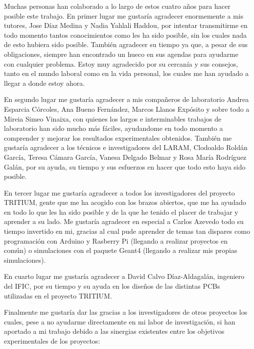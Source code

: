 Muchas personas han colaborado a lo largo de estos cuatro años para hacer posible este trabajo. En primer lugar me gustaría agradecer enormemente a mis tutores, Jose Díaz Medina y Nadia Yahlali Haddou, por intentar transmitirme en todo momento tantos conocimientos como les ha sido posible, sin los cuales nada de esto hubiera sido posible. También agradecer su tiempo ya que, a pesar de sus obligaciones, siempre han encontrado un hueco en sus agendas para ayudarme con cualquier problema. Estoy muy agradecido por su cercanía y sus consejos, tanto en el mundo laboral como en la vida personal, los cuales me han ayudado a llegar a donde estoy ahora.

En segundo lugar me gustaría agradecer a mis compañeros de laboratorio Andrea Esparcia Córcoles, Ana Bueno Fernández, Marcos Llanos Expósito y sobre todo a Mireia Simeo Vinaixa, con quienes los largos e interminables trabajos de laboratorio han sido mucho más fáciles, ayudandome en todo momento a comprender y mejorar los resultados experimentales obtenidos.  También me gustaría agradecer a los técnicos e investigadores del LARAM, Clodoaldo Roldán García, Teresa Cámara García, Vanesa Delgado Belmar y Rosa María Rodríguez Galán, por su ayuda, su tiempo y sus esfuerzos en hacer que todo esto haya sido posible.

En tercer lugar me gustaría agradecer a todos los investigadores del proyecto TRITIUM, gente que me ha acogido con los brazos abiertos, que me ha ayudado en todo lo que les ha sido posible y de la que he tenido el placer de trabajar y aprender a su lado. Me gustaría agradecer en especial a Carlos Azevedo todo su tiempo invertido en mi, gracias al cual pude aprender de temas tan dispares como programación con Arduino y Rasberry Pi (llegando a realizar proyectos en común) o simulaciones con el paquete Geant4 (llegando a realizar mis propias simulaciones).

En cuarto lugar me gustaría agradecer a David Calvo Díaz-Aldagalán, ingeniero del IFIC, por su tiempo y su ayuda en los diseños de las distintas PCBs utilizadas en el proyecto TRITIUM.

Finalmente me gustaría dar las gracias a los investigadores de otros proyectos los cuales, pese a no ayudarme directamente en mi labor de investigación, si han aportado a mi trabajo debido a las sinergias existentes entre los objetivos experimentales de los proyectos:

